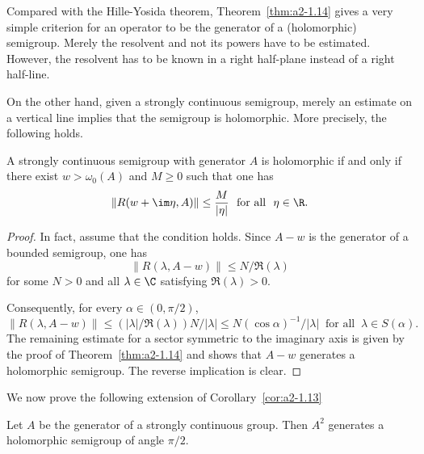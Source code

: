 Compared with the Hille-Yosida theorem, Theorem~\ref{thm:a2-1.14}   gives a very simple criterion for an operator to be the generator of a (holomorphic) semigroup.
Merely the resolvent and not its powers have to be
estimated.
However, the resolvent has to be known in a right half-plane instead of a right half-line.

On the other hand, given a strongly continuous semigroup, merely an estimate on a vertical line implies that the semigroup is holomorphic.
More precisely, the following holds.
\begin{corollary*}\label{cor:a2-1.14-kgk}
A strongly continuous semigroup with generator $A$ is holomorphic if and only if there exist $w > \omega_{0}(A)$ and $M \geq 0$ such that one has
\[
    \|R(w+\im\eta,A)\| \leq \frac{M}{|\eta|}  \ \text{ for all }\ \eta \in \R.
\]
\end{corollary*}
\begin{proof}
In fact, assume that the condition holds.
Since $A-w$ is the generator of a bounded semigroup, one has 
%
\[
	\|R(\lambda,A-w)\| \leq N/\Re(\lambda)
\]
%
for some $N > 0$ and all $\lambda \in \C$ satisfying $\Re(\lambda) > 0$.

Consequently, for every $\alpha \in (0,\pi/2)$, 
\[
\|R(\lambda,A-w)\| \leq (|\lambda|/\Re(\lambda))N/|\lambda| \leq N(\cos\alpha)^{-1}/|\lambda| 
 \ \text{ for all }\ \lambda \in S(\alpha) .
\]
The remaining estimate for a sector symmetric to the imaginary axis is given by the proof of Theorem~\ref{thm:a2-1.14} and shows that $A-w$ generates a holomorphic semigroup.
The reverse implication is clear.
\end{proof}
We now prove the following extension of Corollary~\ref{cor:a2-1.13}  
\begin{theorem}\label{thm:a2-1.15}
Let $A$ be the generator of a strongly continuous group.
Then $A^2$ generates a holomorphic semigroup of angle $\pi/2$.
\end{theorem}
